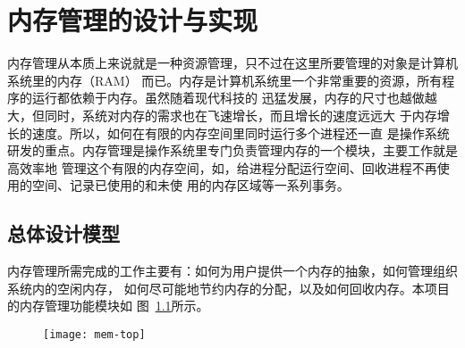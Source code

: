 \documentclass{swfcthesismscctex}
\begin{document}
\chapter{内存管理的设计与实现}

内存管理从本质上来说就是一种资源管理，只不过在这里所要管理的对象是计算机系统里的内存（RAM）
而已。内存是计算机系统里一个非常重要的资源，所有程序的运行都依赖于内存。虽然随着现代科技的
迅猛发展，内存的尺寸也越做越大，但同时，系统对内存的需求也在飞速增长，而且增长的速度远远大
于内存增长的速度\cite{drepper2007every}。所以，如何在有限的内存空间里同时运行多个进程还一直
是操作系统研发的重点。内存管理是操作系统里专门负责管理内存的一个模块，主要工作就是高效率地
管理这个有限的内存空间，如，给进程分配运行空间、回收进程不再使用的空间、记录已使用的和未使
用的内存区域等一系列事务。

\section{总体设计模型}

内存管理所需完成的工作主要有：如何为用户提供一个内存的抽象，如何管理组织系统内的空闲内存，
如何尽可能地节约内存的分配，以及如何回收内存。本项目的内存管理功能模块如
图~\ref{fig:mem-top}所示。

\begin{figure}[t]
  \centering
  \begin{center}
    \texttt{[image: mem-top]}
  \end{center}
  \label{fig:mem-top}
\end{figure}


\end{document}
